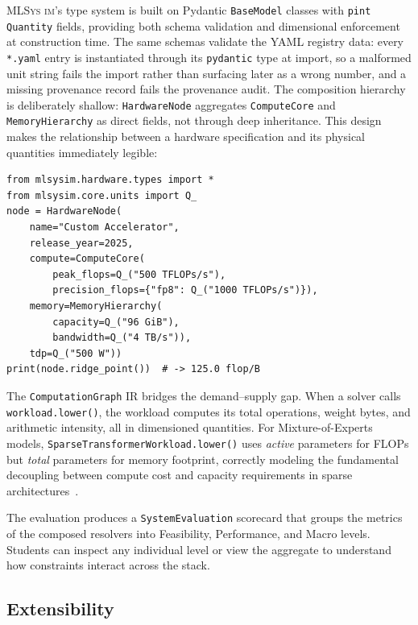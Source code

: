 \documentclass[10pt,twocolumn]{article}
\newcommand{\mlsysim}{\mbox{\textsc{MLSys}\,\textperiodcentered\,\textsc{im}}\xspace}
\begin{document}
\mlsysim's type system is built on Pydantic \texttt{BaseModel} classes with \texttt{pint} \texttt{Quantity} fields, providing both schema validation and dimensional enforcement at construction time. The same schemas validate the YAML registry data: every \texttt{*.yaml} entry is instantiated through its \texttt{pydantic} type at import, so a malformed unit string fails the import rather than surfacing later as a wrong number, and a missing provenance record fails the provenance audit. The composition hierarchy is deliberately shallow: \texttt{HardwareNode} aggregates \texttt{ComputeCore} and \texttt{MemoryHierarchy} as direct fields, not through deep inheritance. This design makes the relationship between a hardware specification and its physical quantities immediately legible:

\begin{lstlisting}[caption={\textbf{Custom Hardware Node.} Composing a hardware specification with dimensional types.},label={lst:hwnode}]
from mlsysim.hardware.types import *
from mlsysim.core.units import Q_
node = HardwareNode(
    name="Custom Accelerator",
    release_year=2025,
    compute=ComputeCore(
        peak_flops=Q_("500 TFLOPs/s"),
        precision_flops={"fp8": Q_("1000 TFLOPs/s")}),
    memory=MemoryHierarchy(
        capacity=Q_("96 GiB"),
        bandwidth=Q_("4 TB/s")),
    tdp=Q_("500 W"))
print(node.ridge_point())  # -> 125.0 flop/B
\end{lstlisting}

The \texttt{ComputationGraph} IR bridges the demand--supply gap. When a solver calls \texttt{workload.lower()}, the workload computes its total operations, weight bytes, and arithmetic intensity, all in dimensioned quantities. For Mixture-of-Experts models, \texttt{SparseTransformerWorkload.lower()} uses \emph{active} parameters for FLOPs but \emph{total} parameters for memory footprint, correctly modeling the fundamental decoupling between compute cost and capacity requirements in sparse architectures~\citep{shazeer2017outrageously}.

The evaluation produces a \texttt{SystemEvaluation} scorecard that groups the metrics of the composed resolvers into Feasibility, Performance, and Macro levels. Students can inspect any individual level or view the aggregate to understand how constraints interact across the stack.

\subsection{Extensibility}
\label{sec:extensibility}
\end{document}
